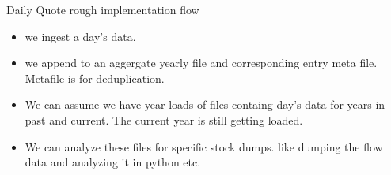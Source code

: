 \documentclass{beamer}
\begin{document}
\begin{frame}{Daily Quote rough implementation flow}
	\begin{itemize}
		\item we ingest a day's data.
		\item we append to an aggergate yearly file and corresponding entry meta file. Metafile is for deduplication.
		\item We can assume we have year loads of files containg day's data for years in past and current. The current year is still getting loaded.

		\item We can analyze these files for specific stock dumps. like dumping the flow data and analyzing it in python etc.
	\end{itemize}
\end{frame}
\end{document}
